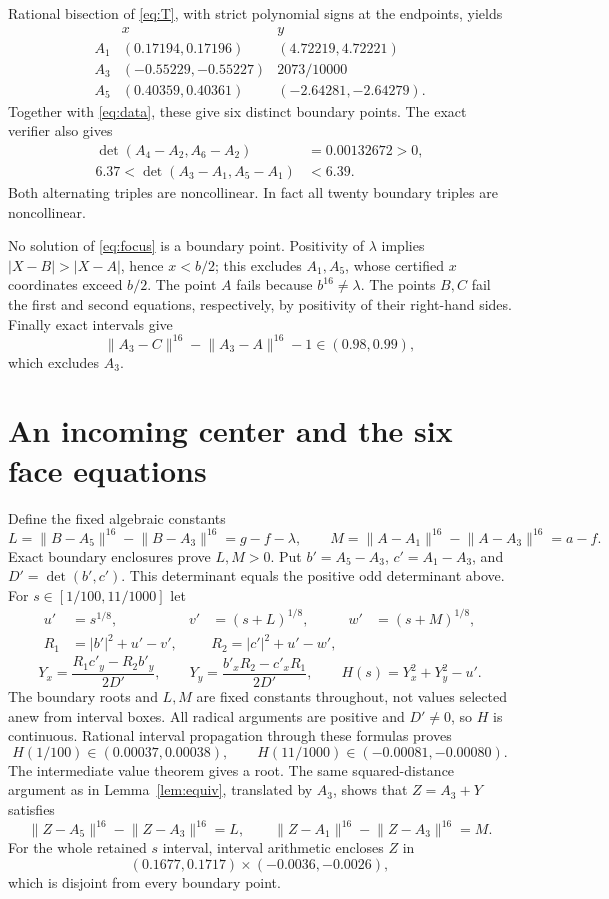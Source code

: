 \documentclass[11pt]{article}
\newcommand{\N}[2]{\lVert #1-#2\rVert^{16}}
\newcommand{\detv}[2]{\det(#1,#2)}
\begin{document}
Rational bisection of \eqref{eq:T}, with strict polynomial signs at the endpoints, yields
\[
\begin{array}{c|cc}
 &x&y\\\hline
 A_1&(0.17194,0.17196)&(4.72219,4.72221)\\
 A_3&(-0.55229,-0.55227)&2073/10000\\
 A_5&(0.40359,0.40361)&(-2.64281,-2.64279).
\end{array}
\]
Together with \eqref{eq:data}, these give six distinct boundary points. The exact verifier also gives
\begin{align*}
 \detv{A_4-A_2}{A_6-A_2}&=0.00132672>0,\\
 6.37<\detv{A_3-A_1}{A_5-A_1}&<6.39.
\end{align*}
Both alternating triples are noncollinear. In fact all twenty boundary triples are noncollinear.

No solution of \eqref{eq:focus} is a boundary point. Positivity of $\lambda$ implies $|X-B|>|X-A|$, hence $x<b/2$; this excludes $A_1,A_5$, whose certified $x$ coordinates exceed $b/2$. The point $A$ fails because $b^{16}\ne\lambda$. The points $B,C$ fail the first and second equations, respectively, by positivity of their right-hand sides. Finally exact intervals give
\[
 \N{A_3}{C}-\N{A_3}{A}-1\in(0.98,0.99),
\]
which excludes $A_3$.

\section{An incoming center and the six face equations}
Define the fixed algebraic constants
\begin{equation}\label{eq:LM}
 L=\N{B}{A_5}-\N{B}{A_3}=g-f-\lambda,\qquad
 M=\N{A}{A_1}-\N{A}{A_3}=a-f.
\end{equation}
Exact boundary enclosures prove $L,M>0$. Put $b'=A_5-A_3$, $c'=A_1-A_3$, and $D'=\detv{b'}{c'}$. This determinant equals the positive odd determinant above. For $s\in[1/100,11/1000]$ let
\begin{align*}
 u'&=s^{1/8},& v'&=(s+L)^{1/8},& w'&=(s+M)^{1/8},\\
 R_1&=|b'|^2+u'-v',&& R_2=|c'|^2+u'-w',
\end{align*}
\[
 Y_x=\frac{R_1c'_y-R_2b'_y}{2D'},\qquad
 Y_y=\frac{b'_xR_2-c'_xR_1}{2D'},\qquad
 H(s)=Y_x^2+Y_y^2-u'.
\]
The boundary roots and $L,M$ are fixed constants throughout, not values selected anew from interval boxes. All radical arguments are positive and $D'\ne0$, so $H$ is continuous. Rational interval propagation through these formulas proves
\[
 H(1/100)\in(0.00037,0.00038),\qquad
 H(11/1000)\in(-0.00081,-0.00080).
\]
The intermediate value theorem gives a root. The same squared-distance argument as in Lemma~\ref{lem:equiv}, translated by $A_3$, shows that $Z=A_3+Y$ satisfies
\begin{equation}\label{eq:incoming}
 \N{Z}{A_5}-\N{Z}{A_3}=L,\qquad
 \N{Z}{A_1}-\N{Z}{A_3}=M.
\end{equation}
For the whole retained $s$ interval, interval arithmetic encloses $Z$ in
\[
 (0.1677,0.1717)\mathbin{\times}(-0.0036,-0.0026),
\]
which is disjoint from every boundary point.
\end{document}

